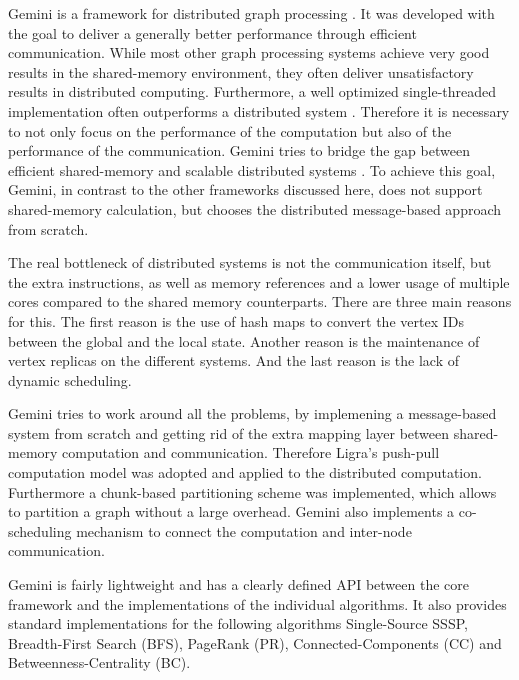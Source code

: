 
Gemini is a framework for distributed graph processing \cite{Gemini}.
It was developed with the goal to deliver a generally better performance through efficient communication.
While most other graph processing systems achieve very good results in the shared-memory environment, they often deliver unsatisfactory results in distributed computing.
Furthermore, a well optimized single-threaded implementation often outperforms a distributed system \cite{scalability}.
Therefore it is necessary to not only focus on the performance of the computation but also of the performance of the communication.
Gemini tries to bridge the gap between efficient shared-memory and scalable distributed systems \cite{Gemini}.
To achieve this goal, Gemini, in contrast to the other frameworks discussed here, does not support shared-memory calculation, but chooses the distributed message-based approach from scratch.

The real bottleneck of distributed systems is not the communication itself, but the extra instructions, as well as memory references and a lower usage of multiple cores compared to the shared memory counterparts.
There are three main reasons for this.
The first reason is the use of hash maps to convert the vertex IDs between the global and the local state.
Another reason is the maintenance of vertex replicas on the different systems.
And the last reason is the lack of dynamic scheduling.

Gemini tries to work around all the problems, by implemening a message-based system from scratch and getting rid of the extra mapping layer between shared-memory computation and communication.
Therefore Ligra's push-pull computation model was adopted and applied to the distributed computation.
Furthermore a chunk-based partitioning scheme was implemented, which allows to partition a graph without a large overhead.
Gemini also implements a co-scheduling mechanism to connect the computation and inter-node communication.

Gemini is fairly lightweight and has a clearly defined API between the core framework and the implementations of the individual algorithms.
It also provides standard implementations for the following algorithms Single-Source SSSP, Breadth-First Search (BFS), PageRank (PR), Connected-Components (CC) and Betweenness-Centrality (BC).
